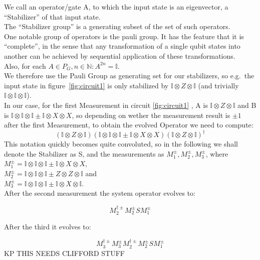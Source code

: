 We call an operator/gate A, to which the input state is an 
eigenvector, a ``Stabilizer'' of that input state. \\
The ``Stabilizer group'' is a generating subset of the set
of such operators.\\
One notable group of operators is the pauli group. It has the
feature that it is ``complete'', in the sense that any
transformation of a single qubit states into another can be
achieved by sequential application of these transformations.\\
Also, for each $A\in P_{G}, n\in \mathbb{N}: A^{2n}=\mathbb{I}$. 
\\
We therefore use the Pauli Group as generating set for our
stabilizers,
so e.g.\ the input state in figure~\ref{fig:circuit1} is only 
stabilized by $\mathbb{I} \otimes Z \otimes \mathbb{I}$ 
(and trivially $\mathbb{I} \otimes \mathbb{I} \otimes \mathbb{I}$).\\
In our case, for the first Measurement in circuit \ref{fig:circuit1}
, A is $\mathbb{I}\otimes Z\otimes\mathbb{I}$ and B is
$\mathbb{I}\otimes\mathbb{I}\otimes\mathbb{I}\pm
	\mathbb{I}\otimes X \otimes X$, so depending on wether
the measurement result is $\pm1$ after the first Measurement,
to obtain the evolved Operator we need to compute:
\begin{equation}
	(\mathbb{I}\otimes Z\otimes\mathbb{I})
	(\mathbb{I}\otimes\mathbb{I}\otimes\mathbb{I}\pm
	\mathbb{I}\otimes X \otimes X) 
	(\mathbb{I}\otimes Z\otimes\mathbb{I})^{\dag}
\end{equation}
This notation quickly becomes quite convoluted, so in the 
following we shall denote the Stabilizer as S, and the 
measurements as $M_{1}^{\pm},M_{2}^{\pm},M_{3}^{\pm}$, where
$M_{1}^{\pm}=\mathbb{I}\otimes\mathbb{I}\otimes\mathbb{I}\pm
\mathbb{I}\otimes X \otimes X$,\\ 
$M_{2}^{\pm}=\mathbb{I}\otimes\mathbb{I}\otimes\mathbb{I}\pm
Z \otimes Z \otimes \mathbb{I}$ and \\
$M_{3}^{\pm}=\mathbb{I}\otimes\mathbb{I}\otimes\mathbb{I}\pm
\mathbb{I} \otimes X \otimes \mathbb{I}$. \\
After the second measurement the system operator evolves to:

\begin{equation}
	M_{2}^{\dagger\pm}M_{2}^{\pm}SM_{1}^{\pm}
\end{equation}

After the third it evolves to:

\begin{equation}
	M_{3}^{\dagger\pm}M_{3}^{\pm}M_{2}^{\dagger\pm}M_{2}^{\pm}SM_{1}^{\pm}
\end{equation}
KP THIS NEEDS CLIFFORD STUFF










